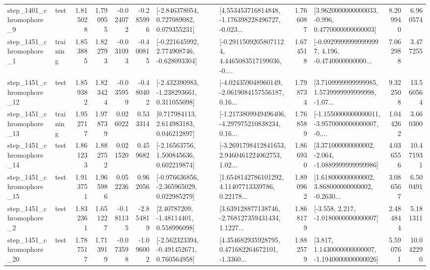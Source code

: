 \begin{tabular}{llrrrrllrlrr}
  step\_1401\_chromophore\_9 &      test &      1.815028 &    1.790955 &     -0.024072 & -0.285996 &    [-2.846378054, 0.727089082, 0.079355231] &  [4.553453716814848, -1.176398228496727, -0.023... &       1.766087 &   [3.9620000000000033, -0.996, 0.4770000000000003] &            8.209940 &          6.960574 \\
  step\_1451\_chromophore\_1 &  training &      1.853885 &    1.822793 &     -0.031093 & -0.400815 &   [-0.221645992, 2.774908746, -0.628093304] &  [-0.29115092058071124, 4.4465083517199036, -0.... &       1.674518 &  [-0.09299999999999997, 4.196, -0.4740000000000... &            7.062988 &          3.477255 \\
 step\_1451\_chromophore\_12 &      test &      1.859382 &    1.823424 &     -0.035959 & -0.480402 &   [-2.432390983, -1.238293661, 0.311055098] &  [-4.024359048960149, -2.0619084157556187, 0.16... &       1.798734 &  [3.7109999999999985, 1.5739999999999998, -1.07... &            9.322508 &         13.560564 \\
 step\_1451\_chromophore\_13 &  training &      1.952717 &    1.978739 &      0.026022 &  0.533314 &     [0.717984113, 2.614983183, 0.046212897] &  [-1.2173809949496406, -4.297975210838234, 0.16... &       1.768589 &  [-1.1550000000000011, -3.9570000000000007, -0.... &            1.044262 &          3.660300 \\
 step\_1451\_chromophore\_14 &      test &      1.861233 &    1.882752 &      0.021520 &  0.459682 &     [-2.16563756, 1.500845636, 0.602219874] &  [-3.2691798412841653, 2.9460461224062753, 1.02... &       1.866930 &   [3.371000000000002, -2.064, -1.0889999999999986] &            4.036556 &         10.471931 \\
 step\_1451\_chromophore\_15 &      test &      1.913751 &    1.965986 &      0.052236 &  0.962056 &   [-0.976636856, -2.365965029, 0.022985279] &  [1.6548142786101292, 4.11407713339786, 0.22178... &       1.890962 &  [1.618000000000002, 3.868000000000002, -0.2630... &            3.086567 &          6.500491 \\
  step\_1451\_chromophore\_2 &      test &      1.832361 &    1.651227 &     -0.181135 & -2.854819 &      [2.40787209, -1.48114401, 0.558996098] &  [3.639128877138746, -2.768127359431434, 1.1227... &       1.868179 &               [-3.558, 2.217, -1.0180000000000007] &            2.484844 &          5.181311 \\
 step\_1451\_chromophore\_20 &      test &      1.787517 &    1.713919 &     -0.073598 & -1.096002 &   [-2.562323394, -0.491452671, 0.760564958] &  [4.354682935928795, 0.471682264672101, -1.3360... &       1.882579 &   [3.817, 1.1430000000000007, -1.1940000000000026] &            5.590761 &         10.042290 \\

\end{tabular}
